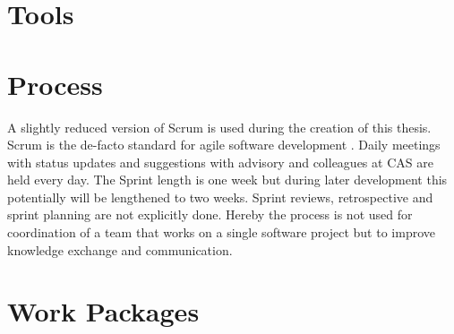 \section{Tools}
\label{sec:Organisation:Tools}


\section{Process}
\label{sec:Organisation:Process}

A slightly reduced version of Scrum is used during the creation of this thesis. Scrum is the de-facto standard for agile software development \cite{glogerScrumPradigmenwechselIm2010}. Daily meetings with status updates and suggestions with advisory and colleagues at CAS are held every day. The Sprint length is one week but during later development this potentially will be lengthened to two weeks. Sprint reviews, retrospective and sprint planning are not explicitly done. Hereby the process is not used for coordination of a team that works on a single software project but to improve knowledge exchange and communication.

\section{Work Packages}
\label{sec:Organisation:WorkPackages}

